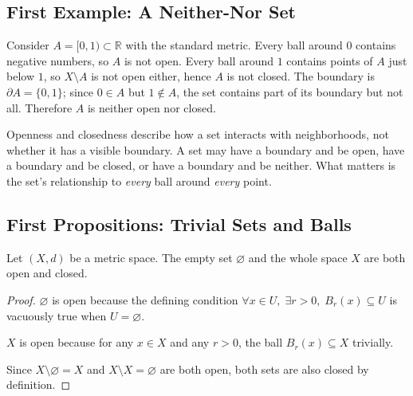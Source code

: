

\subsection{First Example: A Neither-Nor Set}
\label{sec:neither-nor-example}

\begin{example}
Consider $A = [0,1) \subset \mathbb{R}$ with the standard metric.
Every ball around $0$ contains negative numbers, so $A$ is not open.
Every ball around $1$ contains points of $A$ just below $1$, so
$X \setminus A$ is not open either, hence $A$ is not closed.
The boundary is $\partial A = \{0, 1\}$; since $0 \in A$ but $1 \notin A$,
the set contains part of its boundary but not all.
Therefore $A$ is neither open nor closed.
\end{example}

\begin{remark*}
Openness and closedness describe how a set interacts with
neighborhoods, not whether it has a visible boundary.
A set may have a boundary and be open, have a boundary and be closed,
or have a boundary and be neither.
What matters is the set's relationship to \emph{every} ball around
\emph{every} point.
\end{remark*}

\subsection{First Propositions: Trivial Sets and Balls}
\label{sec:trivial-and-balls}

\begin{proposition}
\label{prop:trivial-open-closed}
Let $(X,d)$ be a metric space.
The empty set $\varnothing$ and the whole space $X$ are both open and closed.
\end{proposition}

\begin{proof}
$\varnothing$ is open because the defining condition
$\forall x \in U,\;\exists r>0,\;B_r(x)\subseteq U$
is vacuously true when $U = \varnothing$.

$X$ is open because for any $x \in X$ and any $r > 0$, the ball
$B_r(x) \subseteq X$ trivially.

Since $X \setminus \varnothing = X$ and $X \setminus X = \varnothing$ are both
open, both sets are also closed by definition.
\end{proof}

